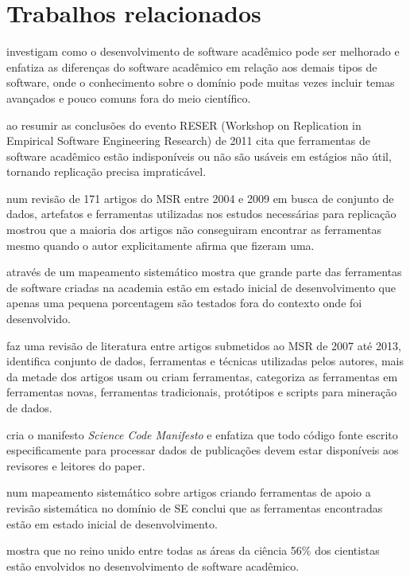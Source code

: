 \section{Trabalhos relacionados}
\label{sec:trabalhosrelacionados}

investigam como o desenvolvimento de software acadêmico pode ser melhorado e
enfatiza as diferenças do software acadêmico em relação aos demais tipos de
software, onde o conhecimento sobre o domínio pode muitas vezes incluir temas
avançados e pouco comuns fora do meio científico.

ao resumir as conclusões do evento RESER (Workshop on Replication in Empirical
Software Engineering Research) de 2011 cita que ferramentas de software
acadêmico estão indisponíveis ou não são usáveis em estágios não útil, tornando
replicação precisa impraticável.

 num revisão de 171 artigos do MSR entre 2004 e 2009
em busca de conjunto de dados, artefatos e ferramentas utilizadas nos estudos
necessárias para replicação mostrou que a maioria dos artigos não conseguiram encontrar
as ferramentas mesmo quando o autor explicitamente afirma que fizeram uma.

através de um mapeamento sistemático mostra que grande parte das ferramentas de
software criadas na academia estão em estado inicial de desenvolvimento que
apenas uma pequena porcentagem são testados fora do contexto onde foi
desenvolvido. 

faz uma revisão de literatura entre artigos submetidos ao MSR de 2007 até 2013,
identifica conjunto de dados, ferramentas e técnicas utilizadas pelos autores,
mais da metade dos artigos usam ou criam ferramentas, categoriza as ferramentas
em ferramentas novas, ferramentas tradicionais, protótipos e scripts para
mineração de dados.

cria o manifesto {\it Science Code Manifesto} e enfatiza que todo código fonte
escrito especificamente para processar dados de publicações devem estar
disponíveis aos revisores e leitores do paper.

 num mapeamento sistemático sobre artigos criando
ferramentas de apoio a revisão sistemática no domínio de SE conclui que as
ferramentas encontradas estão em estado inicial de desenvolvimento.

 mostra que no reino unido entre todas as áreas da
ciência 56\% dos cientistas estão envolvidos no desenvolvimento de software
acadêmico.

